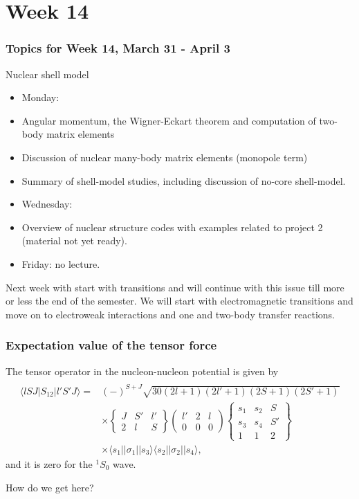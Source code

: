 \documentclass[compress]{beamer}
\newcommand*{\ket}[1]{|#1\rangle}
\newcommand*{\bra}[1]{\langle#1|}
\begin{document}
\section[Week 14]{Week 14}

\frame
{
  \frametitle{Topics for Week 14, March 31 - April 3}
  \begin{block}{Nuclear shell model}
\begin{itemize}
\item Monday:
\item Angular momentum, the Wigner-Eckart theorem and computation of two-body matrix elements
\item Discussion of nuclear many-body matrix elements (monopole term)
\item Summary of shell-model studies, including discussion of no-core shell-model. 
\item Wednesday: 
\item Overview of nuclear structure codes with examples related to project 2 (material not yet ready).
\item Friday: no lecture.
\end{itemize}
Next week with start with transitions and will continue with this issue till more or less the end of the semester.
We will start with electromagnetic transitions and move on to electroweak interactions and one and two-body transfer reactions. 
  \end{block}
} 


\frame
{
\frametitle{Expectation value of the tensor force}
\begin{small}
{\scriptsize
The tensor operator in the nucleon-nucleon potential
is given by
\[
\begin{array}{ll}
&\\
\bra{lSJ}S_{12}\ket{l'S'J} =&
(-)^{S+J}\sqrt{30(2l+1)(2l'+1)(2S+1)(2S'+1)}\\
&\times\left\{\begin{array}{ccc}J&S'&l'\\2&l&S\end{array}\right\}
\left(\begin{array}{ccc}l'&2&l\\0&0&0\end{array}\right)
\left\{\begin{array}{ccc}s_{1}&s_{2}&S\\s_{3}&s_{4}&S'\\
1&1&2\end{array}
\right\}\\
&\times\bra{s_{1}}\left | \sigma_{1}\right | \ket{s_{3}}
\bra{s_{2}}\left | \sigma_{2}\right | \ket{s_{4}},
\end{array}
\]
and it is zero for the $^1S_0$ wave. 

How do we get here?
}
\end{small}
}
\end{document}

